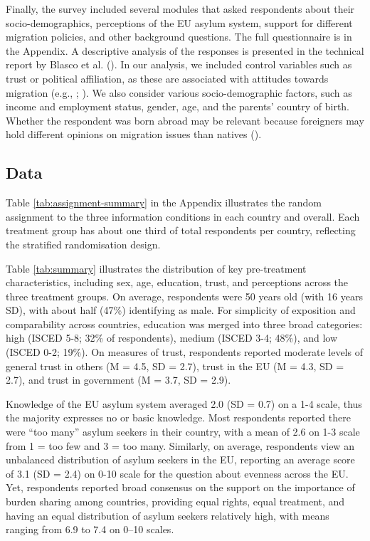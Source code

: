 \documentclass[
  12pt,
  a4paper,
]{article}
\begin{document}
Finally, the survey included several modules that asked respondents about their socio-demographics, perceptions of the EU asylum system, support for different migration policies, and other background questions. The full questionnaire is in the Appendix. A descriptive analysis of the responses is presented in the technical report by Blasco et al. (). In our analysis, we included control variables such as trust or political affiliation, as these are associated with attitudes towards migration (e.g., ; ). We also consider various socio-demographic factors, such as income and employment status, gender, age, and the parents' country of birth. Whether the respondent was born abroad may be relevant because foreigners may hold different opinions on migration issues than natives ().

\subsection{Data}\label{data}

Table \ref{tab:assignment-summary} in the Appendix illustrates the random assignment to the three information conditions in each country and overall. Each treatment group has about one third of total respondents per country, reflecting the stratified randomisation design.

Table \ref{tab:summary} illustrates the distribution of key pre-treatment characteristics, including sex, age, education, trust, and perceptions across the three treatment groups. On average, respondents were 50 years old (with 16 years SD), with about half (47\%) identifying as male. For simplicity of exposition and comparability across countries, education was merged into three broad categories: high (ISCED 5-8; 32\% of respondents), medium (ISCED 3-4; 48\%), and low (ISCED 0-2; 19\%). On measures of trust, respondents reported moderate levels of general trust in others (M = 4.5, SD = 2.7), trust in the EU (M = 4.3, SD = 2.7), and trust in government (M = 3.7, SD = 2.9).

Knowledge of the EU asylum system averaged 2.0 (SD = 0.7) on a 1-4 scale, thus the majority expresses no or basic knowledge. Most respondents reported there were ``too many'' asylum seekers in their country, with a mean of 2.6 on 1-3 scale from 1 = too few and 3 = too many. Similarly, on average, respondents view an unbalanced distribution of asylum seekers in the EU, reporting an average score of 3.1 (SD = 2.4) on 0-10 scale for the question about evenness across the EU. Yet, respondents reported broad consensus on the support on the importance of burden sharing among countries, providing equal rights, equal treatment, and having an equal distribution of asylum seekers relatively high, with means ranging from 6.9 to 7.4 on 0--10 scales.
\end{document}
